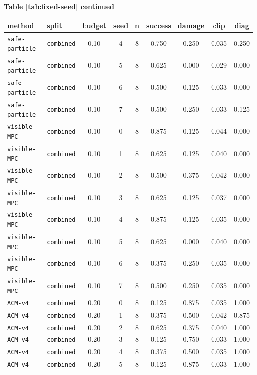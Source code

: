 \documentclass{article}
\begin{document}
\begin{center}
\textbf{Table \ref{tab:fixed-seed} continued}\\[0.4ex]
\begin{tabular}{llccccccc}
\toprule
method & split & budget & seed & n & success & damage & clip & diag \\
\midrule
\texttt{safe-particle} & \texttt{combined} & 0.10 & 4 & 8 & 0.750 & 0.250 & 0.035 & 0.250 \\
\texttt{safe-particle} & \texttt{combined} & 0.10 & 5 & 8 & 0.625 & 0.000 & 0.029 & 0.000 \\
\texttt{safe-particle} & \texttt{combined} & 0.10 & 6 & 8 & 0.500 & 0.125 & 0.033 & 0.000 \\
\texttt{safe-particle} & \texttt{combined} & 0.10 & 7 & 8 & 0.500 & 0.250 & 0.033 & 0.125 \\
\texttt{visible-MPC} & \texttt{combined} & 0.10 & 0 & 8 & 0.875 & 0.125 & 0.044 & 0.000 \\
\texttt{visible-MPC} & \texttt{combined} & 0.10 & 1 & 8 & 0.625 & 0.125 & 0.040 & 0.000 \\
\texttt{visible-MPC} & \texttt{combined} & 0.10 & 2 & 8 & 0.500 & 0.375 & 0.042 & 0.000 \\
\texttt{visible-MPC} & \texttt{combined} & 0.10 & 3 & 8 & 0.625 & 0.125 & 0.037 & 0.000 \\
\texttt{visible-MPC} & \texttt{combined} & 0.10 & 4 & 8 & 0.875 & 0.125 & 0.035 & 0.000 \\
\texttt{visible-MPC} & \texttt{combined} & 0.10 & 5 & 8 & 0.625 & 0.000 & 0.040 & 0.000 \\
\texttt{visible-MPC} & \texttt{combined} & 0.10 & 6 & 8 & 0.375 & 0.250 & 0.035 & 0.000 \\
\texttt{visible-MPC} & \texttt{combined} & 0.10 & 7 & 8 & 0.500 & 0.250 & 0.035 & 0.000 \\
\texttt{ACM-v4} & \texttt{combined} & 0.20 & 0 & 8 & 0.125 & 0.875 & 0.035 & 1.000 \\
\texttt{ACM-v4} & \texttt{combined} & 0.20 & 1 & 8 & 0.375 & 0.500 & 0.042 & 0.875 \\
\texttt{ACM-v4} & \texttt{combined} & 0.20 & 2 & 8 & 0.625 & 0.375 & 0.040 & 1.000 \\
\texttt{ACM-v4} & \texttt{combined} & 0.20 & 3 & 8 & 0.125 & 0.750 & 0.033 & 1.000 \\
\texttt{ACM-v4} & \texttt{combined} & 0.20 & 4 & 8 & 0.375 & 0.500 & 0.035 & 1.000 \\
\texttt{ACM-v4} & \texttt{combined} & 0.20 & 5 & 8 & 0.125 & 0.875 & 0.033 & 1.000 \\

\end{tabular}
\end{center}
\end{document}
